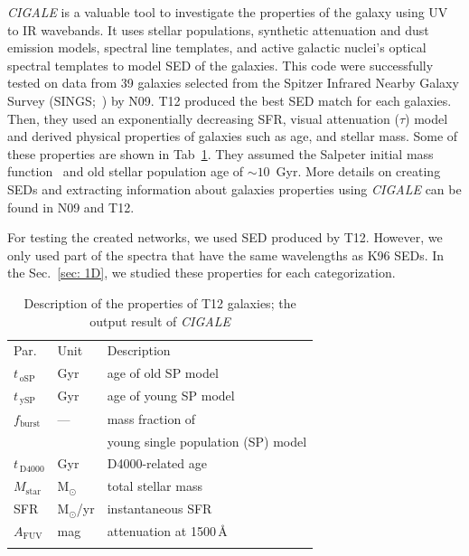     {\em CIGALE} is a valuable tool to investigate the properties of the galaxy using UV to IR wavebands.
    It uses stellar populations, synthetic attenuation and dust emission models, spectral line templates, and active galactic nuclei's optical spectral templates to model SED of the galaxies.
    This code were successfully tested on data from 39 galaxies selected from the Spitzer Infrared Nearby Galaxy Survey (SINGS;~\citep{Kennicutt03}) by N09.
    T12 produced the best SED match for each galaxies.
    Then, they used an exponentially decreasing SFR, visual attenuation ($\tau$) model and derived physical properties of galaxies such as age, and stellar mass.
    Some of these properties are shown in Tab~\ref{tab: props}.
    They assumed the Salpeter initial mass function~\citep{Salpeter55} and old stellar population age of $\sim 10$~Gyr.
    More details on creating SEDs and extracting information about galaxies properties using {\em CIGALE} can be found in N09 and T12.
    
     For testing the created networks, we used SED produced by T12. 
     However, we only used part of the spectra that have the same wavelengths as K96 SEDs. %
     In the Sec.~\ref{sec: 1D}, we studied these properties for each categorization.
    
    
    \begin{table}
\caption[]{Description of the properties of T12 galaxies; the output result of {\em CIGALE}}     
\label{tab: props}
\centering
\begin{tabular}{l l l}
\hline\hline
\noalign{\smallskip}
Par. & Unit & Description\\
\noalign{\smallskip}
\hline
\noalign{\smallskip}
$t_{\,\mathrm{oSP}}$ & Gyr & age of old SP model \\
$t_{\,\mathrm{ySP}}$ & Gyr & age of young SP model \\
$f_\mathrm{burst}$ & --- & mass fraction of \\
& & young single population (SP) model \\
\noalign{\smallskip}
$t_{\,\mathrm{D4000}}$ & Gyr & D4000-related age \\
\noalign{\smallskip}
$M_\mathrm{star}$ & M$_\odot$ & total stellar mass  \\
SFR & M$_\odot$/yr & instantaneous SFR  \\
$A_\mathrm{FUV}$ & mag & attenuation at 1500\,\AA{} \\
\noalign{\smallskip}
\hline
\end{tabular}
\end{table}
